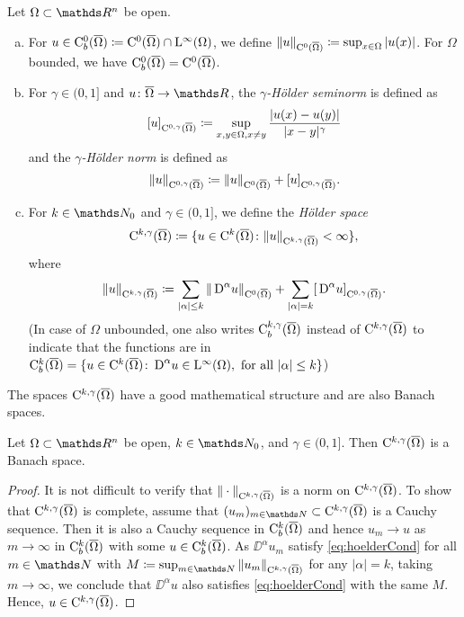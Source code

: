 \begin{defn}
  Let $\Omega \subset \R^n$ be open.
  \begin{enumerate}[a)]
    \item For $u \in \mathrm{C}_b^0(\overline\Omega) \coloneqq \mathrm{C}^0(\overline\Omega) \cap \mathrm{L}^\infty(\Omega)$, we define $\|u\|_{\mathrm{C}^0(\overline\Omega)} \coloneqq \sup_{x \in \Omega} |u(x)|$.
      For $\Omega$ bounded, we have $\mathrm{C}_b^0(\overline\Omega) = \mathrm{C}^0(\overline\Omega)$.

    \item For $\gamma \in (0,1]$ and $u \colon \overline\Omega \to \R$, the \emph{$\gamma$-Hölder seminorm} is defined as
    $$
    [u]_{\mathrm{C}^{0,\gamma}(\overline\Omega)} \coloneqq \sup_{x,y \in \Omega, x \neq y} \frac{|u(x)  - u(y)|}{|x - y|^\gamma}
    $$
    and the \emph{$\gamma$-Hölder norm} is defined as 
    $$
    \|u\|_{\mathrm{C}^{0,\gamma}(\overline\Omega)} \coloneqq \| u\|_{\mathrm{C}^0(\overline\Omega)} + [u]_{\mathrm{C}^{0,\gamma}(\overline\Omega)}.
    $$

    \item For $k \in \N_0$ and $\gamma \in (0,1]$, we define the \emph{Hölder space}
      $$
      \mathrm{C}^{k,\gamma}(\overline\Omega) \coloneqq \{ u \in \mathrm{C}^k(\overline\Omega) \colon \|u\|_{\mathrm{C}^{k,\gamma}(\overline\Omega)} < \infty \},
      $$
      where
      $$
      \| u\|_{\mathrm{C}^{k,\gamma}(\overline\Omega)} \coloneqq \sum_{|\alpha| \leq k} \|\,{\operatorname{D}}^\alpha u\|_{\mathrm{C}^0(\overline\Omega)} + \sum_{|\alpha| = k} [\,{\operatorname{D}}^\alpha u]_{\mathrm{C}^{0,\gamma}(\overline\Omega)}.
      $$
      (In case of $\Omega$ unbounded, one also writes $\mathrm{C}_b^{k,\gamma}(\overline\Omega)$ instead of $\mathrm{C}^{k,\gamma}(\overline\Omega)$ to indicate that the functions are in $\mathrm{C}_b^k(\overline\Omega) = \{ u \in \mathrm{C}^k(\overline\Omega) \colon \,{\operatorname{D}}^\alpha u \in \mathrm{L}^\infty(\Omega), \text{ for all } |\alpha| \leq k \}$)
  \end{enumerate}
\end{defn}

The spaces $\mathrm{C}^{k,\gamma}(\overline\Omega)$ have a good mathematical structure and are also Banach spaces.

\begin{prop}
  Let $\Omega \subset \R^n$ be open, $k \in \N_0$, and $\gamma \in (0,1]$.
  Then $\mathrm{C}^{k,\gamma}(\overline\Omega)$ is a Banach space.
\end{prop}

\begin{proof}
  It is not difficult to verify that $\| \cdot \|_{\mathrm{C}^{k,\gamma}(\overline\Omega)}$ is a norm on $\mathrm{C}^{k,\gamma}(\overline\Omega)$.
  To show that $\mathrm{C}^{k,\gamma}(\overline\Omega)$ is complete, assume that $(u_m)_{m \in \N} \subset \CC^{k,\gamma}(\overline\Omega)$ is a Cauchy sequence.
  Then it is also a Cauchy sequence in $\mathrm{C}_b^k(\overline\Omega)$ and hence $u_m \to u$ as $m \to \infty$ in $\mathrm{C}_b^k(\overline\Omega)$ with some $u \in \mathrm{C}_b^k(\overline\Omega)$.
  As $\DD^\alpha u_m$ satisfy \eqref{eq:hoelderCond} for all $m \in \N$ with $M \coloneqq \sup_{m \in \N} \| u_m\|_{\CC^{k,\gamma}(\overline\Omega)}$ for any $|\alpha| = k$, taking $m \to \infty$, we conclude that $\DD^\alpha u$ also satisfies \eqref{eq:hoelderCond} with the same $M$.
  Hence, $u \in \mathrm{C}^{k,\gamma}(\overline\Omega)$.
\end{proof}

